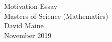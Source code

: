 \begin{titlepage}
    \vspace*{5em}
    \begin{center}
        \huge{Motivation Essay} \\[0.2em]
        \LARGE{Masters of Science (Mathematics)} \\[2em]
        \large{
            David Maine \\[2em]
            November 2019
        }
    \end{center}
    \vspace*{\fill}
\end{titlepage}
\restoregeometry